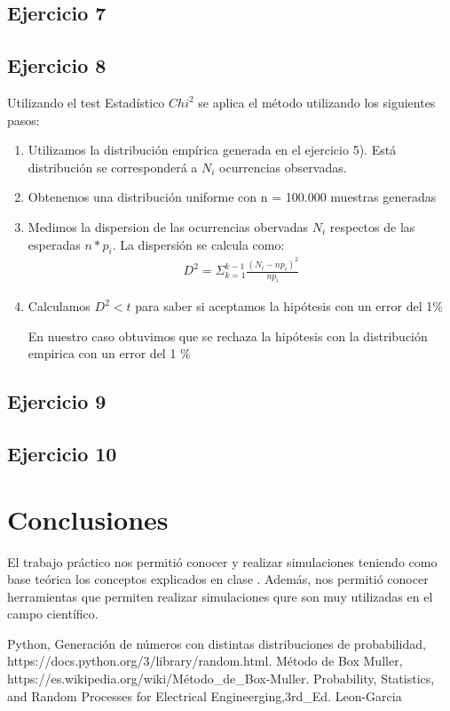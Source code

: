 \documentclass[11pt,a4paper]{article}
\begin{document}
	\subsection{Ejercicio 7}


	\subsection{Ejercicio 8}
	Utilizando el test Estadístico $Chi^2$ se aplica el método utilizando los siguientes pasos:
	\begin{enumerate}
		\item Utilizamos la distribución empírica generada en el ejercicio 5). Está distribución se corresponderá a $N_i$ ocurrencias observadas.
		\item Obtenemos una distribución uniforme con n = 100.000 muestras generadas
		\item Medimos la dispersion de las ocurrencias obervadas $N_i$ respectos de las esperadas $n*p_i$. La dispersión se calcula como:
		\begin{align*}
		D^2 = \Sigma_{k=1}^{k-1} \frac{(N_i - np_i)^2}{np_i}
		\end{align*}
		\item Calculamos $D^2 < t$ para saber si aceptamos la hipótesis  con un error del 1\%
		
		En nuestro caso obtuvimos que se rechaza la hipótesis con la distribución empirica con un error del 1 \%
	\end{enumerate}

	\subsection{Ejercicio 9}


	\subsection{Ejercicio 10}

\newpage
\section{Conclusiones}
El trabajo práctico nos permitió conocer y realizar simulaciones teniendo como base teórica los conceptos explicados en clase . Además, nos permitió conocer herramientas que permiten realizar simulaciones qure son muy utilizadas en el campo científico.


\begin{thebibliography}{10}
	\bibitem{} Python, Generación de números con distintas distribuciones de probabilidad, https://docs.python.org/3/library/random.html.
	\bibitem{} Método de Box Muller, https://es.wikipedia.org/wiki/Método\_de\_Box-Muller.
	\bibitem{} Probability, Statistics, and Random Processes for Electrical Engineerging,3rd\_Ed. Leon-Garcia
\end{thebibliography}
\end{document}
